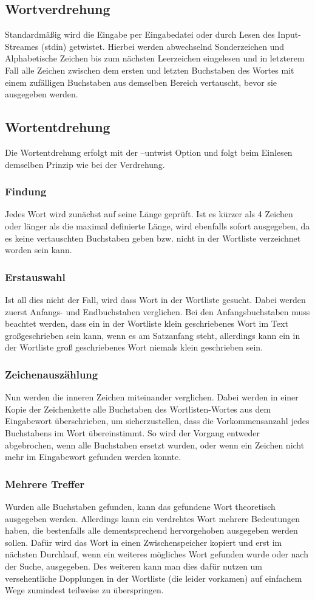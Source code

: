 \documentclass[a4paper,10pt,ngerman]{scrartcl}
\newcommand{\newsubsection}{\vspace{2\baselineskip}\subsection}
\newcommand{\newsubsubsection}{\vspace{1\baselineskip}\subsubsection}
\begin{document}
\pagebreak
\newsubsection{Wortverdrehung}

Standardmäßig wird die Eingabe per Eingabedatei oder durch Lesen des Input-Streames (stdin) getwistet.
Hierbei werden abwechselnd Sonderzeichen und Alphabetische Zeichen bis zum nächsten Leerzeichen eingelesen und in letzterem Fall alle Zeichen zwischen dem ersten und letzten Buchstaben des Wortes mit einem zufälligen Buchstaben aus demselben Bereich vertauscht, bevor sie ausgegeben werden.

\newsubsection{Wortentdrehung}

Die Wortentdrehung erfolgt mit der --untwist Option und folgt beim Einlesen demselben Prinzip wie bei der Verdrehung.

\newsubsubsection{Findung}
Jedes Wort wird zunächst auf seine Länge geprüft. Ist es kürzer als 4 Zeichen oder länger als die maximal definierte Länge, wird ebenfalls sofort ausgegeben, da es keine vertauschten Buchstaben geben bzw. nicht in der Wortliste verzeichnet worden sein kann.

\newsubsubsection{Erstauswahl}
Ist all dies nicht der Fall, wird dass Wort in der Wortliste gesucht. Dabei werden zuerst Anfangs- und Endbuchstaben verglichen. Bei den Anfangsbuchstaben muss beachtet werden, dass ein in der Wortliste klein geschriebenes Wort im Text großgeschrieben sein kann, wenn es am Satzanfang steht, allerdings kann ein in der Wortliste groß geschriebenes Wort niemals klein geschrieben sein.

\newsubsubsection{Zeichenauszählung}
Nun werden die inneren Zeichen miteinander verglichen. Dabei werden in einer Kopie der Zeichenkette alle Buchstaben des Wortlisten-Wortes aus dem Eingabewort überschrieben, um sicherzustellen, dass die Vorkommensanzahl jedes Buchstabens im Wort übereinstimmt. So wird der Vorgang entweder abgebrochen, wenn alle Buchstaben ersetzt wurden, oder wenn ein Zeichen nicht mehr im Eingabewort gefunden werden konnte.

\newsubsubsection{Mehrere Treffer}
Wurden alle Buchstaben gefunden, kann das gefundene Wort theoretisch ausgegeben werden. Allerdings kann ein verdrehtes Wort mehrere Bedeutungen haben, die bestenfalls alle dementsprechend hervorgehoben ausgegeben werden sollen. Dafür wird das Wort in einen Zwischenspeicher kopiert und erst im nächsten Durchlauf, wenn ein weiteres mögliches Wort gefunden wurde oder nach der Suche, ausgegeben. Des weiteren kann man dies dafür nutzen um versehentliche Dopplungen in der Wortliste (die leider vorkamen) auf einfachem Wege zumindest teilweise zu überspringen.
\end{document}
